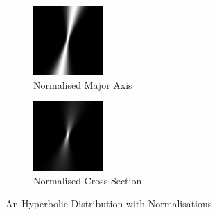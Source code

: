 \documentclass[a4paper, 11pt, titlepage]{article}
\begin{document}
\begin{figure}
\begin{subfigure}{.33\textwidth}
          \includegraphics[width=.9\linewidth]{images/GaussianRay3.png}
          \caption{Normalised Major Axis}
          \label{fig:hyperbolicsub2}
        \end{subfigure}
        \begin{subfigure}{.33\textwidth}
          \centering
          \includegraphics[width=.9\linewidth]{images/GaussianRay2.png}
          \caption{Normalised Cross Section}
          \label{fig:hyperbolicsub3}
        \end{subfigure}
        \caption{An Hyperbolic Distribution with Normalisations}
        \label{fig:hyperbolic}
        \end{figure}
\end{document}
